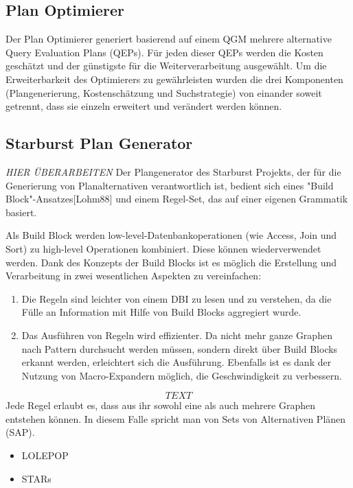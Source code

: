 \subsection{Plan Optimierer}

Der Plan Optimierer generiert basierend auf einem QGM mehrere alternative Query Evaluation Plans (QEPs). Für jeden dieser QEPs werden die Kosten geschätzt und der günstigste für die Weiterverarbeitung ausgewählt. Um die Erweiterbarkeit des Optimierers zu gewährleisten wurden die drei Komponenten (Plangenerierung, Kostenschätzung und Suchstrategie) von einander soweit getrennt, dass sie einzeln erweitert und verändert werden können. 

\subsection{Starburst Plan Generator}
\emph{HIER ÜBERARBEITEN}
Der Plangenerator des Starburst Projekts, der für die Generierung von Planalternativen verantwortlich ist, bedient sich eines "Build Block"-Ansatzes[Lohm88] und einem Regel-Set, das auf einer eigenen Grammatik basiert.  

Als Build Block werden low-level-Datenbankoperationen (wie Access, Join und Sort) zu high-level Operationen kombiniert. Diese können wiederverwendet werden. Dank des Konzepts der Build Blocks ist es möglich die Erstellung und Verarbeitung in zwei wesentlichen Aspekten zu vereinfachen:


\begin{enumerate}


\item Die Regeln sind leichter von einem DBI zu lesen und zu verstehen, da die Fülle an Information mit Hilfe von Build Blocks aggregiert wurde.

\item Das Ausführen von Regeln wird effizienter. Da nicht mehr ganze Graphen nach Pattern durchsucht werden müssen, sondern direkt über Build Blocks erkannt werden, erleichtert sich die Ausführung. Ebenfalls ist es dank der Nutzung von Macro-Expandern möglich, die Geschwindigkeit zu verbessern.


\end{enumerate}


$$TEXT$$
Jede Regel erlaubt es, dass aus ihr sowohl eine als auch mehrere Graphen entstehen können. In diesem Falle spricht man von Sets von Alternativen Plänen (SAP). 


\begin{itemize}
\item LOLEPOP
\item STARs
\end{itemize}

 